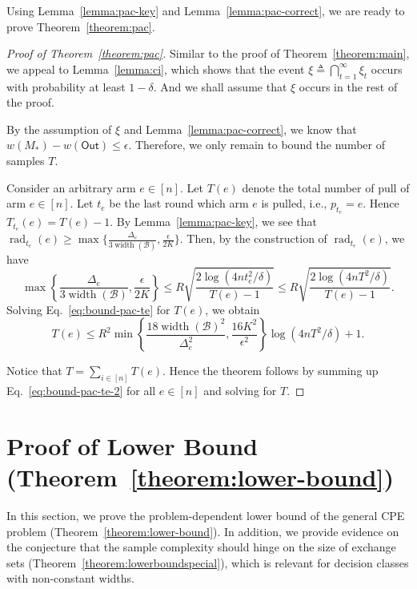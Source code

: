 \documentclass{article}
\newcommand{\Problem}{{CPE}\xspace}
\newcommand{\B}{\mathcal B}
\DeclareMathOperator{\rank}{width}
\DeclareMathOperator{\rad}{rad}
\newcommand{\out}{\mathsf{Out}}
\begin{document}
Using Lemma~\ref{lemma:pac-key} and Lemma~\ref{lemma:pac-correct}, we are ready to prove Theorem~\ref{theorem:pac}.
\begin{proof}[Proof of Theorem~\ref{theorem:pac}]
Similar to the proof of Theorem~\ref{theorem:main}, we appeal to Lemma~\ref{lemma:ci}, which shows that the event $\xi \triangleq \bigcap_{t=1}^\infty \xi_t$ occurs with probability at least $1-\delta$.
And we shall assume that $\xi$ occurs in the rest of the proof.

By the assumption of $\xi$ and Lemma~\ref{lemma:pac-correct}, we know that $w(M_*)-w(\out) \le \epsilon$. Therefore, we only remain to bound the number of samples $T$.

Consider an arbitrary arm $e\in [n]$.
Let $T(e)$ denote the total number of pull of arm $e\in [n]$.
Let $t_e$ be the last round which arm $e$ is pulled, i.e., $p_{t_e} = e$. 
Hence $T_{t_e}(e) = T(e) - 1$.
By Lemma~\ref{lemma:pac-key}, we see that 
$\rad_{t_e}(e) \ge \max\{\frac{\Delta_e}{3\rank(\B)},\frac{\epsilon}{2K}\}$.
Then, by the construction of $\rad_{t_e}(e)$, we have
\begin{equation}
\max\left\{\frac{\Delta_e}{3\rank(\B)},\frac{\epsilon}{2K}\right\} \le 
R\sqrt{\frac{2\log\left(4n t_e^2/\delta\right)}{T(e)-1}} \le
R\sqrt{\frac{2\log\left(4n T^2/\delta\right)}{T(e)-1}}.
\label{eq:bound-pac-te}
\end{equation}
Solving Eq.~\eqref{eq:bound-pac-te} for $T(e)$, we obtain
\begin{equation}
\label{eq:bound-pac-te-2}
T(e) \le R^2\min\left\{\frac{18 \rank(\B)^2}{\Delta_e^2},\frac{16K^2}{\epsilon^2}\right\} \log(4nT^2/\delta)+1.
\end{equation}

Notice that $T=\sum_{i\in[n]} T(e)$. 
Hence the theorem follows by summing up Eq.~\eqref{eq:bound-pac-te-2} for all $e\in [n]$ and solving for $T$.
\end{proof}



\section{Proof of Lower Bound (Theorem~\ref{theorem:lower-bound})}
\label{section:lowerbound-proof}
In this section, we prove the problem-dependent lower bound of the general \Problem problem (Theorem~\ref{theorem:lower-bound}). 
In addition, we provide evidence on the conjecture that the sample complexity should hinge on the size of exchange sets (Theorem~\ref{theorem:lowerboundspecial}), which is relevant for decision classes with non-constant widths.
\end{document}
